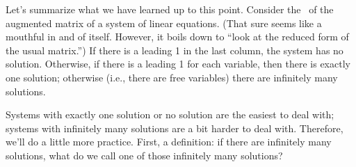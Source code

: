 %
%

%
%

Let's summarize what we have learned up to this point. Consider the \rref\ of the augmented matrix of a system of linear equations. (That sure seems like a mouthful in and of itself. However, it boils down to ``look at the reduced form of the usual matrix.'') If there is a leading 1 in the last column, the system has no solution. Otherwise, if there is a leading 1 for each variable, then there is exactly one solution; otherwise (i.e., there are free variables) there are infinitely many solutions.

Systems with exactly one solution or no solution are the easiest to deal with; systems with infinitely many solutions are a bit harder to deal with. Therefore, we'll do a little more practice. First, a definition: if there are infinitely many solutions, what do we call one of those infinitely many solutions?

\smallskip

